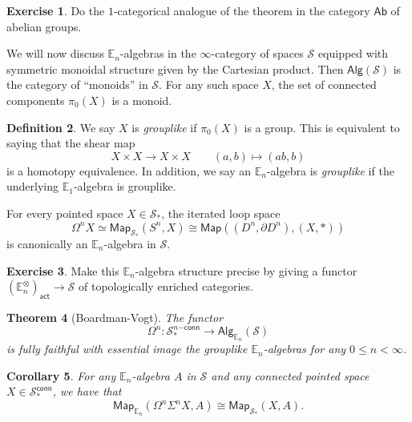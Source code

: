 \documentclass[10pt, oneside]{memoir}
\newtheorem{thm}{Theorem}[subsection]
\newtheorem{cor}[thm]{Corollary}
\theoremstyle{definition}
\newtheorem{defn}[thm]{Definition}
\newtheorem{exer}[thm]{Exercise}
\theoremstyle{remark}
\theoremstyle{plain}
\theoremstyle{definition}
\theoremstyle{remark}
\newcommand{\E}{\mathbb{E}}
\newcommand{\mc}[1]{\mathcal{#1}}
\newcommand{\ms}[1]{\mathsf{#1}}
\newcommand{\1}{\mathbf{1}}
\newcommand{\2}{\mathbf{2}}
\newcommand{\3}{\mathbf{3}}
\begin{document}
\begin{exer}
    Do the $1$-categorical analogue of the theorem in the category $\ms{Ab}$ of abelian groups.
\end{exer}

We will now discuss $\E_n$-algebras in the $\infty$-category of spaces $\mc{S}$ equipped with symmetric monoidal structure given by the Cartesian product. Then $\ms{Alg}(\mc{S})$ is the category of ``monoids'' in $\mc{S}$. For any such space $X$, the set of connected components $\pi_0(X)$ is a monoid.

\begin{defn}
    We say $X$ is \textit{grouplike} if $\pi_0 (X)$ is a group. This is equivalent to saying that the shear map
    \[ X \times X \to X \times X \qquad (a,b) \mapsto (ab, b) \]
    is a homotopy equivalence. In addition, we say an $\E_n$-algebra is \textit{grouplike} if the underlying $\E_1$-algebra is grouplike.
\end{defn}

For every pointed space $X \in \mc{S}_*$, the iterated loop space
\[ \Omega^n X \simeq \ms{Map}_{\mc{S}_*}(S^n, X) \cong \ms{Map}((D^n, \partial D^n), (X, *)) \]
is canonically an $\E_n$-algebra in $\mc{S}$.

\begin{exer}
    Make this $\E_n$-algebra structure precise by giving a functor $(\E_n^{\otimes})_{\ms{act}} \to \mc{S}$ of topologically enriched categories.
\end{exer}

\begin{thm}[Boardman-Vogt]\label{thm:enalgspaces}
    The functor 
    \[ \Omega^n \colon \mc{S}_*^{n\ms{-conn}} \to \ms{Alg}_{\E_n}(\mc{S}) \]
    is fully faithful with essential image the grouplike $\E_n$-algebras for any $0 \leq n < \infty$.
\end{thm}

\begin{cor}
    For any $\E_n$-algebra $A$ in $\mc{S}$ and any connected pointed space $X \in \mc{S}_*^{\ms{conn}}$, we have that
    \[ \ms{Map}_{\E_n}(\Omega^n \Sigma^n X, A) \cong \ms{Map}_{\mc{S}_*}(X, A). \]
\end{cor}
\end{document}
